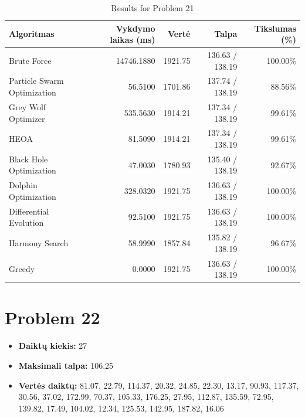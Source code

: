 \documentclass[a4paper,11pt]{article}
\begin{document}
\begin{table}[h!]
\centering
\begin{tabular}{lrrrr}
\toprule
\textbf{Algoritmas} & \textbf{Vykdymo laikas (ms)} & \textbf{Vertė} & \textbf{Talpa} & \textbf{Tikslumas (\%)} \\
\midrule
Brute Force & 14746.1880 & 1921.75 & 136.63 / 138.19 & 100.00\% \\
Particle Swarm Optimization & 56.5100 & 1701.86 & 137.74 / 138.19 & 88.56\% \\
Grey Wolf Optimizer & 535.5630 & 1914.21 & 137.34 / 138.19 & 99.61\% \\
HEOA & 81.5090 & 1914.21 & 137.34 / 138.19 & 99.61\% \\
Black Hole Optimization & 47.0030 & 1780.93 & 135.40 / 138.19 & 92.67\% \\
Dolphin Optimization & 328.0320 & 1921.75 & 136.63 / 138.19 & 100.00\% \\
Differential Evolution & 92.5100 & 1921.75 & 136.63 / 138.19 & 100.00\% \\
Harmony Search & 58.9990 & 1857.84 & 135.82 / 138.19 & 96.67\% \\
Greedy & 0.0000 & 1921.75 & 136.63 / 138.19 & 100.00\% \\
\bottomrule
\end{tabular}
\caption{Results for Problem 21}
\end{table}
\clearpage

\section*{Problem 22}
\begin{itemize}
    \item \textbf{Daiktų kiekis:} 27
    \item \textbf{Maksimali talpa:} 106.25
    \item \textbf{Vertės daiktų:} 81.07, 22.79, 114.37, 20.32, 24.85, 22.30, 13.17, 90.93, 117.37, 30.56, 37.02, 172.99, 70.37, 105.33, 176.25, 27.95, 112.87, 135.59, 72.95, 139.82, 17.49, 104.02, 12.34, 125.53, 142.95, 187.82, 16.06
\end{itemize}
\end{document}

